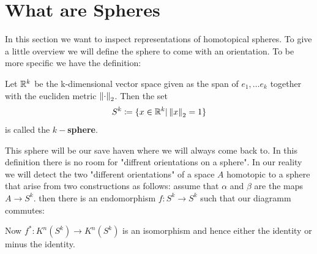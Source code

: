 \section{What are Spheres}
In this section we want to inspect representations of homotopical spheres. To give a little overview we will define the sphere to come with an orientation. To be more specific we have the definition:
\begin{definition}
	Let $\mathbb{R}^k$ be the k-dimensional vector space given as the span of $e_1,\dots e_k$ together with the eucliden metric $\left\lVert\cdot\right\rVert_2$. Then the set
	\begin{align*}
		S^k\coloneq \{x\in \mathbb{R}^k|\left\lVert x\right\rVert_2=1 \}
	\end{align*} is called the \textbf{$k-$sphere}.
\end{definition} This sphere will be our save haven where we will always come back to. In this definition there is no room for "diffrent orientations on a sphere". In our reality we will detect the two  "different orientations" of a space $A$ homotopic to a sphere that arise from two constructions as follows: assume that $\alpha$ and $\beta$ are the maps $A\to S^k$. then there is an endomorphism $f: S^k\to S^k$ such that our diagramm commutes:
\begin{center}
\end{center}
Now $f^*:K^n(S^k)\to K^n(S^k)$ is an isomorphism and hence either the identity or minus the identity.


